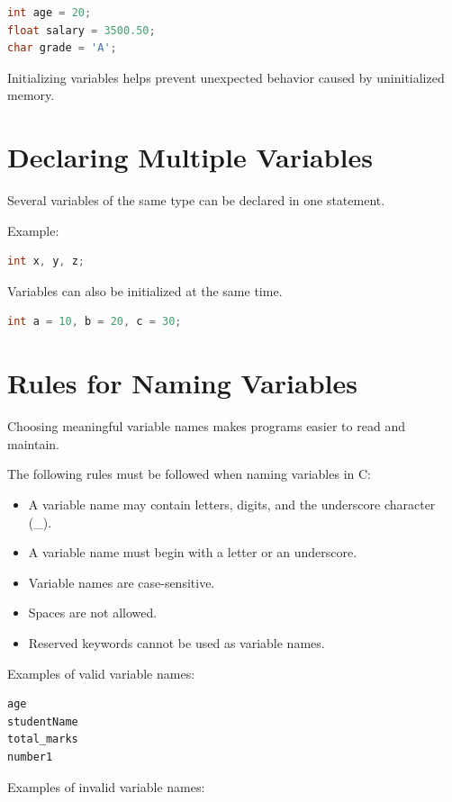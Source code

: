 \documentclass[12pt,openany]{book}
\begin{document}
\begin{lstlisting}[language=C]
int age = 20;
float salary = 3500.50;
char grade = 'A';
\end{lstlisting}

Initializing variables helps prevent unexpected behavior caused by uninitialized memory.

\section{Declaring Multiple Variables}

Several variables of the same type can be declared in one statement.

Example:

\begin{lstlisting}[language=C]
int x, y, z;
\end{lstlisting}

Variables can also be initialized at the same time.

\begin{lstlisting}[language=C]
int a = 10, b = 20, c = 30;
\end{lstlisting}
\section{Rules for Naming Variables}

Choosing meaningful variable names makes programs easier to read and maintain.

The following rules must be followed when naming variables in C:

\begin{itemize}
    \item A variable name may contain letters, digits, and the underscore character (\_).
    \item A variable name must begin with a letter or an underscore.
    \item Variable names are case-sensitive.
    \item Spaces are not allowed.
    \item Reserved keywords cannot be used as variable names.
\end{itemize}

Examples of valid variable names:

\begin{lstlisting}[language=C]
age
studentName
total_marks
number1
\end{lstlisting}

Examples of invalid variable names:
\end{document}
